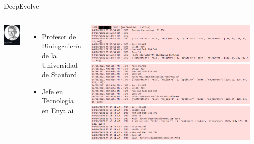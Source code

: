 \documentclass{beamer}
\begin{document}
\begin{frame}{DeepEvolve}
    \begin{columns}
    \includegraphics[width=0.8\columnwidth]{Imagenes/jan.png}
    \begin{itemize}
        \item Profesor de Bioingeniería de la Universidad de Stanford
        \item Jefe en Tecnología en Enya.ai
    \end{itemize}
    
    \includegraphics[width=\columnwidth]{Imagenes/algoritmo.png}
    \includegraphics[width=\columnwidth]{Imagenes/algoritmo2.png}
    \includegraphics[width=\columnwidth]{Imagenes/algoritmo3.png}
    \end{columns}
\end{frame}
\end{document}
